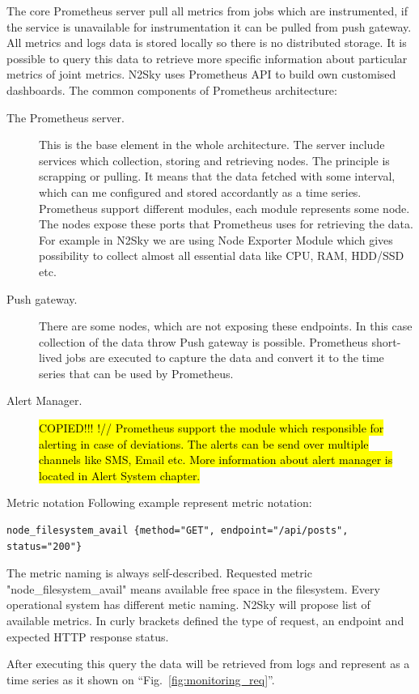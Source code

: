 The core Prometheus server pull all metrics from jobs which are instrumented, if the service is unavailable for instrumentation it can be pulled from push gateway. All metrics and logs data is stored locally so there is no distributed storage. It is possible to query this data to retrieve more specific information about particular metrics of joint metrics. N2Sky uses Prometheus API to build own customised dashboards. 
The common components of Prometheus architecture:
\begin{description}
\item[The Prometheus server.] This is the base element in the whole architecture. The server include services which collection, storing and retrieving nodes. The principle is scrapping or pulling. It means that the data fetched with some interval, which can me configured and stored accordantly as a time series. Prometheus support different modules, each module represents some node. The nodes expose these ports that Prometheus uses for retrieving the data. For example in N2Sky we are using Node Exporter Module which gives possibility to collect almost all essential data like CPU, RAM, HDD/SSD etc.
\item[Push gateway.] There are some nodes, which are not exposing these endpoints. In this case collection of the data throw Push gateway is possible.  Prometheus short-lived jobs are executed to capture the data and convert it to the time series that can be used by Prometheus.
\item [Alert Manager.] \hl{COPIED!!! !// Prometheus support the module which responsible for alerting in case of deviations. The alerts can be send over multiple channels like SMS, Email etc. More information about alert manager is located in Alert System chapter.}
\end{description}

Metric notation 
Following example represent metric notation:
\begin{lstlisting}
node_filesystem_avail {method="GET", endpoint="/api/posts", status="200"}
\end{lstlisting}

The metric naming is always self-described.  Requested metric "node\_filesystem\_avail" means available free space in the filesystem.  Every operational system has different metic naming. N2Sky will propose list of available metrics. In curly brackets defined the type of request, an endpoint and expected HTTP response status.

After executing this query the data will be retrieved from logs and represent as a time series as it shown on ``Fig.~\ref{fig:monitoring_req}''.



